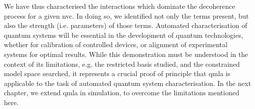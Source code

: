 We have thus characterised the interactions which dominate the decoherence process for a given \gls{nvc}. 
In doing so, we identified not only the terms present, but also the strength (i.e. parameters) of those terms. 
Automated characterisation of quantum systems will be essential in the development of quantum technologies, 
    whether for calibration of controlled devices, or alignment of experimental systems for optimal results. 
While this demonstration must be understood in the context of its limitations, 
    e.g. the restricted basis studied, and the constrained \gls{model space} searched, 
    it represents a crucial proof of principle that \gls{qmla} is applicable to the task 
    of automated quantum system characterisation. 
In the next chapter, we extend \gls{qmla} in simulation, to overcome the limitations mentioned here. 


